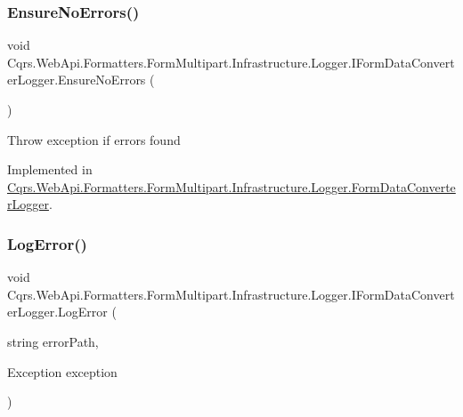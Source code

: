 \subsubsection{\texorpdfstring{Ensure\+No\+Errors()}{EnsureNoErrors()}}
{\footnotesize\ttfamily void Cqrs.\+Web\+Api.\+Formatters.\+Form\+Multipart.\+Infrastructure.\+Logger.\+I\+Form\+Data\+Converter\+Logger.\+Ensure\+No\+Errors (\begin{DoxyParamCaption}{ }\end{DoxyParamCaption})}



Throw exception if errors found 



Implemented in \hyperlink{classCqrs_1_1WebApi_1_1Formatters_1_1FormMultipart_1_1Infrastructure_1_1Logger_1_1FormDataConverterLogger_a8e3cd3f8d5e7b3d2b24b67b2ce3e69df_a8e3cd3f8d5e7b3d2b24b67b2ce3e69df}{Cqrs.\+Web\+Api.\+Formatters.\+Form\+Multipart.\+Infrastructure.\+Logger.\+Form\+Data\+Converter\+Logger}.

\mbox{\label{interfaceCqrs_1_1WebApi_1_1Formatters_1_1FormMultipart_1_1Infrastructure_1_1Logger_1_1IFormDataConverterLogger_a7da0b7749a50f6fed2cb5ab0d8efef2a_a7da0b7749a50f6fed2cb5ab0d8efef2a}} 
\subsubsection{\texorpdfstring{Log\+Error()}{LogError()}\hspace{0.1cm}{\footnotesize\ttfamily [1/2]}}
{\footnotesize\ttfamily void Cqrs.\+Web\+Api.\+Formatters.\+Form\+Multipart.\+Infrastructure.\+Logger.\+I\+Form\+Data\+Converter\+Logger.\+Log\+Error (\begin{DoxyParamCaption}\item[{string}]{error\+Path,  }\item[{Exception}]{exception }\end{DoxyParamCaption})}



